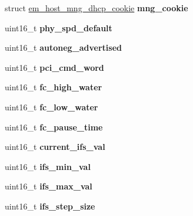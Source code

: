 \begin{DoxyCompactItemize}
\item 
\mbox{\label{structem__hw_ab3dd78028f8dcee4089b83e41dbcb719}} 
struct \mbox{\hyperlink{structem__host__mng__dhcp__cookie}{em\+\_\+host\+\_\+mng\+\_\+dhcp\+\_\+cookie}} {\bfseries mng\+\_\+cookie}
\item 
\mbox{\label{structem__hw_a12afd3393ba35f387df909bc61a2573e}} 
uint16\+\_\+t {\bfseries phy\+\_\+spd\+\_\+default}
\item 
\mbox{\label{structem__hw_a54f13cf3e09bcc7a0ed1182e4b928a88}} 
uint16\+\_\+t {\bfseries autoneg\+\_\+advertised}
\item 
\mbox{\label{structem__hw_afa39e5b4ae00646b186ee430df531db0}} 
uint16\+\_\+t {\bfseries pci\+\_\+cmd\+\_\+word}
\item 
\mbox{\label{structem__hw_abc8f333f12fadc032617202c853428b9}} 
uint16\+\_\+t {\bfseries fc\+\_\+high\+\_\+water}
\item 
\mbox{\label{structem__hw_ad2a5b505ec82fae1457e7461d7885c44}} 
uint16\+\_\+t {\bfseries fc\+\_\+low\+\_\+water}
\item 
\mbox{\label{structem__hw_aba00cb43742c7635a2bb4b45ad180e40}} 
uint16\+\_\+t {\bfseries fc\+\_\+pause\+\_\+time}
\item 
\mbox{\label{structem__hw_af28fb53659c89b36d0a4aeaf3e2bc420}} 
uint16\+\_\+t {\bfseries current\+\_\+ifs\+\_\+val}
\item 
\mbox{\label{structem__hw_ab710ece0664e48502344df3d60358e2c}} 
uint16\+\_\+t {\bfseries ifs\+\_\+min\+\_\+val}
\item 
\mbox{\label{structem__hw_ac9e9dfbe8f7bd2b40bacc049849b30f7}} 
uint16\+\_\+t {\bfseries ifs\+\_\+max\+\_\+val}
\item 
\mbox{\label{structem__hw_acdc65328e226d868c1b3865ff7f80c6a}} 
uint16\+\_\+t {\bfseries ifs\+\_\+step\+\_\+size}
\item 
\mbox{\label{structem__hw_a221f79cc57270b4fd211bf96f838c43f}} 

\end{DoxyCompactItemize}
